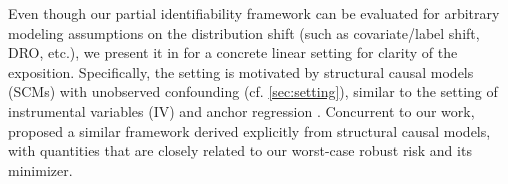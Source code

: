 Even though our partial identifiability framework 
can be evaluated for arbitrary %
modeling assumptions on the distribution shift (such as covariate/label shift, DRO, etc.), %
we present it
in  for a concrete linear setting for clarity of the exposition.
Specifically, the setting is motivated by structural causal models (SCMs) with unobserved confounding (cf. \cref{sec:setting}), similar to the setting of instrumental variables (IV) and anchor regression \citep{rothenhausler2021anchor,saengkyongam2022exploiting}. Concurrent to our work, \cite{bellot2022partial} proposed a similar framework derived explicitly from structural causal models, with quantities that are closely related to our worst-case robust risk and its minimizer. 


